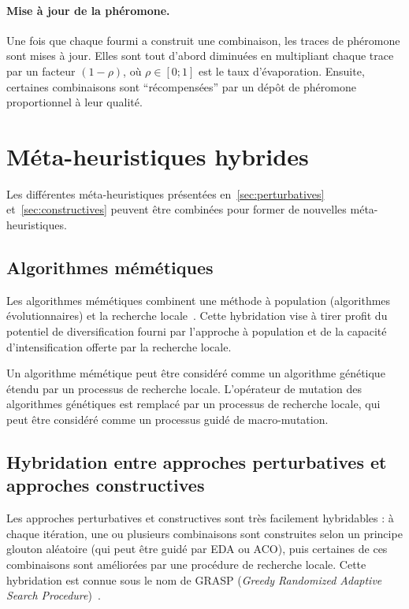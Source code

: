 \documentclass[12pt,a4paper]{book}
\begin{document}
\paragraph{Mise à jour de la phéromone.}
Une fois que chaque fourmi a construit une combinaison, les traces de phéromone sont mises à jour. Elles sont tout d'abord diminuées en multipliant chaque trace par un facteur $(1 - \rho)$, où $\rho \in [0; 1]$ est le taux d'évaporation. Ensuite, certaines combinaisons sont ``récompensées'' par un dépôt de phéromone proportionnel à leur qualité.

\section{Méta-heuristiques hybrides}
\label{sec:hybrides}

Les différentes méta-heuristiques présentées en~\ref{sec:perturbatives} et~\ref{sec:constructives} peuvent être combinées pour former de nouvelles méta-heuristiques.

\subsection{Algorithmes mémétiques}

Les algorithmes mémétiques combinent une méthode à population (algorithmes évolutionnaires) et la recherche locale~\cite{moscato1999,neri2011}. Cette hybridation vise à tirer profit du potentiel de diversification fourni par l'approche à population et de la capacité d'intensification offerte par la recherche locale.

Un algorithme mémétique peut être considéré comme un algorithme génétique étendu par un processus de recherche locale. L'opérateur de mutation des algorithmes génétiques est remplacé par un processus de recherche locale, qui peut être considéré comme un processus guidé de macro-mutation.

\subsection{Hybridation entre approches perturbatives et approches constructives}

Les approches perturbatives et constructives sont très facilement hybridables : à chaque itération, une ou plusieurs combinaisons sont construites selon un principe glouton aléatoire (qui peut être guidé par EDA ou ACO), puis certaines de ces combinaisons sont améliorées par une procédure de recherche locale. Cette hybridation est connue sous le nom de GRASP (\textit{Greedy Randomized Adaptive Search Procedure})~\cite{resende2003}.
\end{document}
